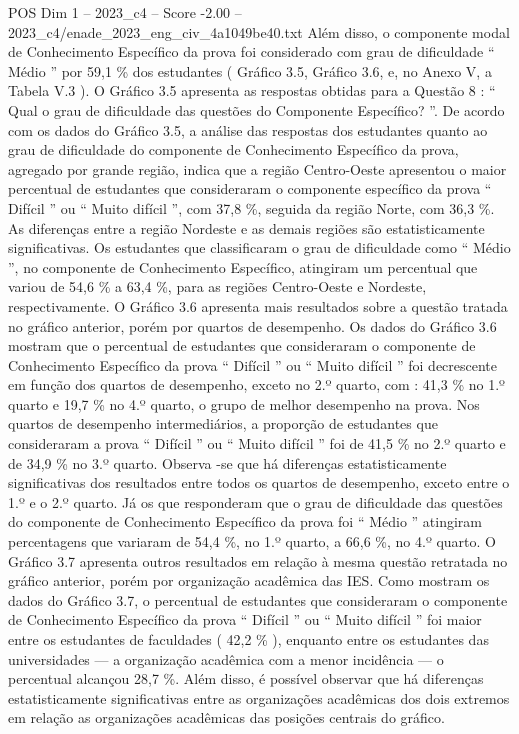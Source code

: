 \begin{textsample}{POS Dim 1 – 2023\_c4 – Score -2.00 – 2023\_c4/enade\_2023\_eng\_civ\_4a1049be40.txt}
Além disso, o componente modal de Conhecimento Específico da prova foi considerado com grau de dificuldade “ Médio ” por 59,1 \% dos estudantes ( Gráfico 3.5, Gráfico 3.6, e, no Anexo V, a Tabela V.3 ).
O Gráfico 3.5 apresenta as respostas obtidas para a Questão 8 : “ Qual o grau de dificuldade das questões do Componente Específico? ”.
De acordo com os dados do Gráfico 3.5, a análise das respostas dos estudantes quanto ao grau de dificuldade do componente de Conhecimento Específico da prova, agregado por grande região, indica que a região Centro-Oeste apresentou o maior percentual de estudantes que consideraram o componente específico da prova “ Difícil ” ou “ Muito difícil ”, com 37,8 \%, seguida da região Norte, com 36,3 \%.
As diferenças entre a região Nordeste e as demais regiões são estatisticamente significativas.
Os estudantes que classificaram o grau de dificuldade como “ Médio ”, no componente de Conhecimento Específico, atingiram um percentual que variou de 54,6 \% a 63,4 \%, para as regiões Centro-Oeste e Nordeste, respectivamente.
O Gráfico 3.6 apresenta mais resultados sobre a questão tratada no gráfico anterior, porém por quartos de desempenho.
Os dados do Gráfico 3.6 mostram que o percentual de estudantes que consideraram o componente de Conhecimento Específico da prova “ Difícil ” ou “ Muito difícil ” foi decrescente em função dos quartos de desempenho, exceto no 2.º quarto, com : 41,3 \% no 1.º quarto e 19,7 \% no 4.º quarto, o grupo de melhor desempenho na prova.
Nos quartos de desempenho intermediários, a proporção de estudantes que consideraram a prova “ Difícil ” ou “ Muito difícil ” foi de 41,5 \% no 2.º quarto e de 34,9 \% no 3.º quarto.
Observa -se que há diferenças estatisticamente significativas dos resultados entre todos os quartos de desempenho, exceto entre o 1.º e o 2.º quarto.
Já os que responderam que o grau de dificuldade das questões do componente de Conhecimento Específico da prova foi “ Médio ” atingiram percentagens que variaram de 54,4 \%, no 1.º quarto, a 66,6 \%, no 4.º quarto.
O Gráfico 3.7 apresenta outros resultados em relação à mesma questão retratada no gráfico anterior, porém por organização acadêmica das IES.
Como mostram os dados do Gráfico 3.7, o percentual de estudantes que consideraram o componente de Conhecimento Específico da prova “ Difícil ” ou “ Muito difícil ” foi maior entre os estudantes de faculdades ( 42,2 \% ), enquanto entre os estudantes das universidades — a organização acadêmica com a menor incidência — o percentual alcançou 28,7 \%.
Além disso, é possível observar que há diferenças estatisticamente significativas entre as organizações acadêmicas dos dois extremos em relação as organizações acadêmicas das posições centrais do gráfico.

\end{textsample}

